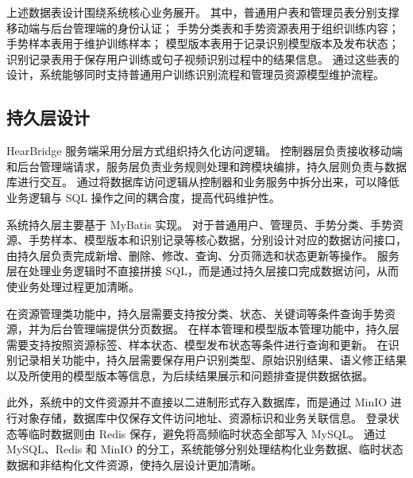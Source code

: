 

上述数据表设计围绕系统核心业务展开。
其中，普通用户表和管理员表分别支撑移动端与后台管理端的身份认证；
手势分类表和手势资源表用于组织训练内容；
手势样本表用于维护训练样本；
模型版本表用于记录识别模型版本及发布状态；
识别记录表用于保存用户训练或句子视频识别过程中的结果信息。
通过这些表的设计，系统能够同时支持普通用户训练识别流程和管理员资源模型维护流程。

\subsection{持久层设计}

HearBridge 服务端采用分层方式组织持久化访问逻辑。
控制器层负责接收移动端和后台管理端请求，服务层负责业务规则处理和跨模块编排，持久层则负责与数据库进行交互。
通过将数据库访问逻辑从控制器和业务服务中拆分出来，可以降低业务逻辑与 SQL 操作之间的耦合度，提高代码维护性。

系统持久层主要基于 MyBatis 实现。
对于普通用户、管理员、手势分类、手势资源、手势样本、模型版本和识别记录等核心数据，分别设计对应的数据访问接口，由持久层负责完成新增、删除、修改、查询、分页筛选和状态更新等操作。
服务层在处理业务逻辑时不直接拼接 SQL，而是通过持久层接口完成数据访问，从而使业务处理过程更加清晰。

在资源管理类功能中，持久层需要支持按分类、状态、关键词等条件查询手势资源，并为后台管理端提供分页数据。
在样本管理和模型版本管理功能中，持久层需要支持按照资源标签、样本状态、模型发布状态等条件进行查询和更新。
在识别记录相关功能中，持久层需要保存用户识别类型、原始识别结果、语义修正结果以及所使用的模型版本等信息，为后续结果展示和问题排查提供数据依据。

此外，系统中的文件资源并不直接以二进制形式存入数据库，而是通过 MinIO 进行对象存储，数据库中仅保存文件访问地址、资源标识和业务关联信息。
登录状态等临时数据则由 Redis 保存，避免将高频临时状态全部写入 MySQL。
通过 MySQL、Redis 和 MinIO 的分工，系统能够分别处理结构化业务数据、临时状态数据和非结构化文件资源，使持久层设计更加清晰。
